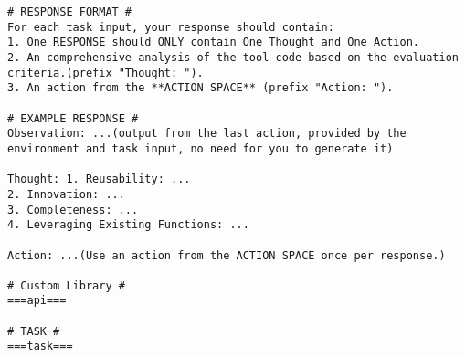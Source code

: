 \begin{tcolorbox}[title=Prompt of Self-Check Step 1, breakable, width=\textwidth,top=0mm]
\begin{Verbatim}[breaklines, fontsize=\footnotesize]
# RESPONSE FORMAT #
For each task input, your response should contain:
1. One RESPONSE should ONLY contain One Thought and One Action.
2. An comprehensive analysis of the tool code based on the evaluation criteria.(prefix "Thought: ").
3. An action from the **ACTION SPACE** (prefix "Action: "). 

# EXAMPLE RESPONSE #
Observation: ...(output from the last action, provided by the environment and task input, no need for you to generate it)

Thought: 1. Reusability: ...
2. Innovation: ...
3. Completeness: ...
4. Leveraging Existing Functions: ...

Action: ...(Use an action from the ACTION SPACE once per response.)

# Custom Library #
===api===

# TASK #
===task===
\end{Verbatim}
\end{tcolorbox}

